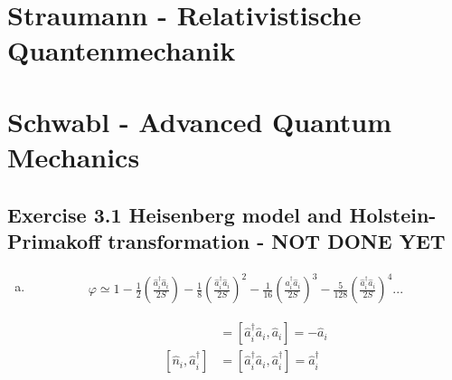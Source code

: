 \documentclass[../main.tex]{subfiles}
\begin{document}
\section{{\sc Straumann} - Relativistische Quantenmechanik }

\section{{\sc Schwabl} - Advanced Quantum Mechanics}

\subsection{Exercise 3.1 Heisenberg model and Holstein-Primakoff transformation - NOT DONE YET}

\begin{enumerate}[a)]

\item \begin{align}
\varphi\simeq1
-\frac{1}{2}\left(\frac{\hat{a}_i^\dagger \hat{a}_i}{2S}\right)
-\frac{1}{8}\left(\frac{\hat{a}_i^\dagger \hat{a}_i}{2S}\right)^2
-\frac{1}{16}\left(\frac{\hat{a}_i^\dagger \hat{a}_i}{2S}\right)^3
-\frac{5}{128}\left(\frac{\hat{a}_i^\dagger \hat{a}_i}{2S}\right)^4...
\end{align}

\begin{align}
[\hat{n}_i,\hat{a}_i]
&=[\hat{a}_i^\dagger \hat{a}_i,\hat{a}_i]
=-\hat{a}_i\\
[\hat{n}_i,\hat{a}_i^\dagger]
&=[\hat{a}_i^\dagger \hat{a}_i,\hat{a}_i^\dagger]
=\hat{a}_i^\dagger
\end{align}


\end{enumerate}
\end{document}
